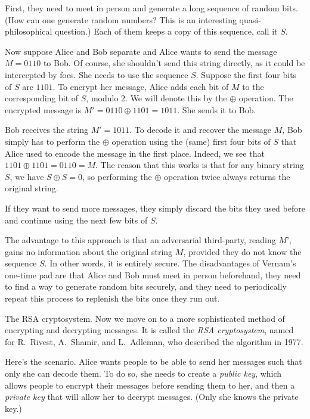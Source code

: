 First, they need to meet in person and generate a long sequence of random bits. (How can
one generate random numbers? This is an interesting quasi-philosophical question.) Each of
them keeps a copy of this sequence, call it $S$.

Now suppose Alice and Bob separate and Alice wants to send the message $M = 0110$ to Bob. Of course,
she shouldn't send this string directly, as it could be intercepted by foes. She needs to use
the sequence $S$. Suppose
the first four bits of $S$ are $1101$. To encrypt her message, Alice adds each bit of $M$
to the corresponding bit of $S$, modulo $2$. We will denote this by the $\oplus$ operation.
The encrypted message is $M'=0110\oplus 1101 = 1011$. She sends it to Bob.

Bob receives the string $M' = 1011$. To decode it and recover the message $M$, Bob simply has to
perform the $\oplus$ operation using the (same) first four bits of $S$ that Alice used
to encode the message in the first place. Indeed, we see that $1101\oplus 1101 = 0110 = M$.
The reason that this works is that for any binary string $S$, we have $S\oplus S = 0$,
so performing the $\oplus$ operation twice always returns the original string.

If they want to send more messages, they simply discard the bits they used before and continue
using the next few bits of $S$.

The advantage to this approach is that an adversarial third-party, reading $M$', gains
no information about the original string $M$, provided they do not know the sequence $S$.
In other words, it is entirely secure.
The disadvantages of Vernam's one-time pad are that Alice and Bob must meet in person beforehand,
they need to find a way to generate random bits securely, and they need to periodically
repeat this process to replenish the bits once they run out.

\medskip\boldlabel The RSA cryptosystem.
Now we move on to a more sophisticated method of encrypting and decrypting messages.
It is called the {\it {\mc RSA} cryptosystem}, named for R.~Rivest, A.~Shamir, and L.~Adleman,
who described the algorithm in 1977.

Here's the scenario. Alice wants people to be able to send her messages such that
only she can decode them. To do so, she needs to create a {\it public key}, which allows
people to encrypt their messages before sending them to her, and then a {\it private key}
that will allow her to decrypt messages. (Only she knows the private key.)

